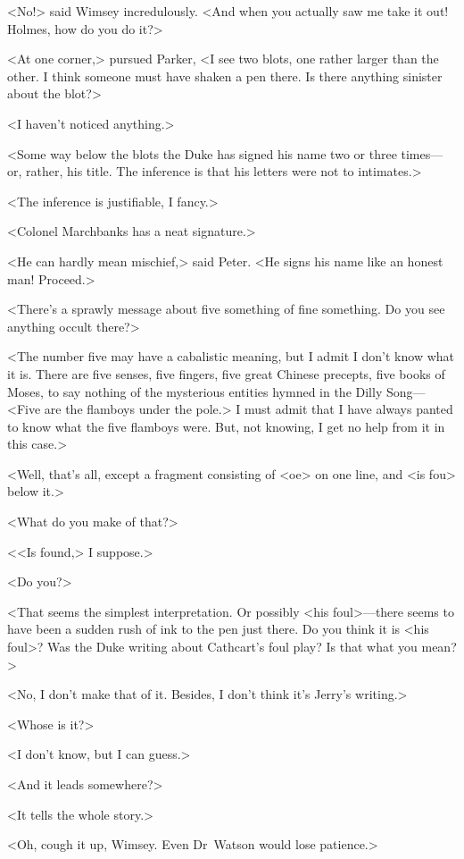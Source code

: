 <No!> said Wimsey incredulously. <And when you actually saw me take it out! Holmes, how do you do it?>

<At one corner,> pursued Parker, <I see two blots, one rather larger than the other. I think someone must have shaken a pen there. Is there anything sinister about the blot?>

<I haven't noticed anything.>

<Some way below the blots the Duke has signed his name two or three times—or, rather, his title. The inference is that his letters were not to intimates.>

<The inference is justifiable, I fancy.>

<Colonel Marchbanks has a neat signature.>

<He can hardly mean mischief,> said Peter. <He signs his name like an honest man! Proceed.>

<There's a sprawly message about five something of fine something. Do you see anything occult there?>

<The number five may have a cabalistic meaning, but I admit I don't know what it is. There are five senses, five fingers, five great Chinese precepts, five books of Moses, to say nothing of the mysterious entities hymned in the Dilly Song—<Five are the flamboys under the pole.> I must admit that I have always panted to know what the five flamboys were. But, not knowing, I get no help from it in this case.>

<Well, that's all, except a fragment consisting of <oe> on one line, and <is fou\longdash> below it.>

<What do you make of that?>

<<Is found,> I suppose.>

<Do you?>

<That seems the simplest interpretation. Or possibly <his foul>—there seems to have been a sudden rush of ink to the pen just there. Do you think it is <his foul>? Was the Duke writing about Cathcart's foul play? Is that what you mean?>

<No, I don't make that of it. Besides, I don't think it's Jerry's writing.>

<Whose is it?>

<I don't know, but I can guess.>

<And it leads somewhere?>

<It tells the whole story.>

<Oh, cough it up, Wimsey. Even Dr~Watson would lose patience.>

